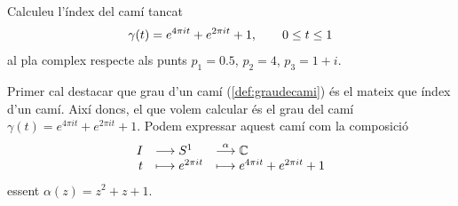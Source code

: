 \documentclass[../main.tex]{subfiles}
\begin{document}
\begin{exercici}
[Exercici 14]\label{exercici2.14} Calculeu l'índex del camí tancat
\begin{equation}
    \notag
    \gamma(t) = e^{4\pi it}+e^{2\pi it}+1,\qquad 0\leq t\leq 1
\end{equation}
al pla complex respecte als punts $p_1=0.5$, $p_2 = 4$, $p_3=1+i$.
\end{exercici}
\begin{sol}
Primer cal destacar que grau d'un camí (\ref{def:graudecami}) és el mateix que índex d'un camí. Així doncs, el que volem calcular és el grau del camí $\gamma(t) = e^{4\pi it}+e^{2\pi it}+1$. Podem expressar aquest camí com la composició
\begin{equation}
    \notag
    \begin{array}{rll}
        I & \longrightarrow S^1 & \overset{\alpha}{\longrightarrow} \mathbb{C} \\
        t & \longmapsto e^{2\pi it} & \longmapsto e^{4\pi it}+e^{2\pi it}+1
    \end{array}
\end{equation}
essent $\alpha(z) = z^2+z+1$.


\end{sol}
\end{document}
